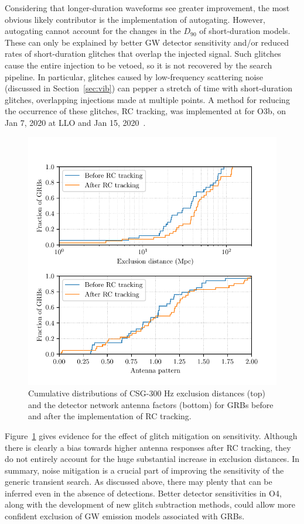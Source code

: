 Considering that longer-duration waveforms see greater improvement, the most obvious likely contributor is the implementation of autogating.
However, autogating cannot account for the changes in the $D_{90}$ of short-duration models.
These can only be explained by better GW detector sensitivity and/or reduced rates of short-duration glitches that overlap the injected signal.
Such glitches cause the entire injection to be vetoed, so it is not recovered by the search pipeline.
In particular, glitches caused by low-frequency scattering noise (discussed in Section~\ref{sec:vib}) can pepper a stretch of time with short-duration glitches, overlapping injections made at multiple points.
A method for reducing the occurrence of these glitches, \ac{RC} tracking, was implemented at for O3b, on Jan 7, 2020 at \ac{LLO} and Jan 15, 2020~\citep{Soni_2020}.

\begin{figure}[h]
  \centering
  \includegraphics{figures/grb/compare-rc.pdf}
  \caption
	{Cumulative distributions of CSG-300 Hz exclusion distances (top) and the detector network antenna factors (bottom) for GRBs before and after the implementation of RC tracking.}
  \label{fig:grb-o3b-compare-rc}
\end{figure}

Figure~\ref{fig:grb-o3b-compare-rc} gives evidence for the effect of glitch mitigation on \xpip sensitivity.
Although there is clearly a bias towards higher antenna responses after RC tracking, they do not entirely account for the huge substantial increase in exclusion distances.
In summary, noise mitigation is a crucial part of improving the sensitivity of the generic transient search.
As discussed above, there may plenty that can be inferred even in the absence of detections.
Better detector sensitivities in \ac{O4}, along with the development of new glitch subtraction methods, could allow more confident exclusion of GW emission models associated with GRBs.


